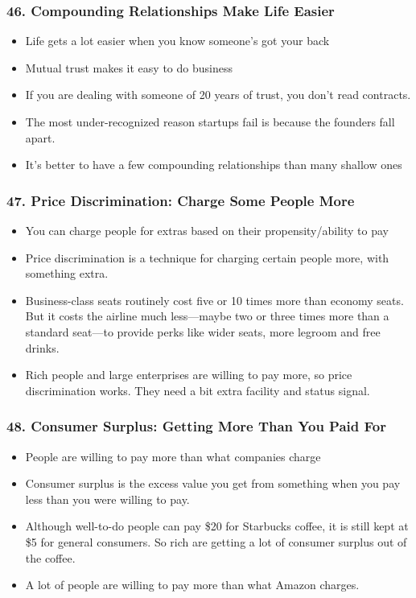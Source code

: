\begin{frame}[fragile]
\frametitle{46. Compounding Relationships Make Life Easier}
\begin{itemize}
\item Life gets a lot easier when you know someone’s got your back
\item Mutual trust makes it easy to do business
\item If you are dealing with someone of 20 years of trust, you don't read contracts.
\item The most under-recognized reason startups fail is because the founders fall apart.
\item It’s better to have a few compounding relationships than many shallow ones
\end{itemize}
\end{frame}

\begin{frame}[fragile]
\frametitle{47. Price Discrimination: Charge Some People More}
\begin{itemize}
\item You can charge people for extras based on their propensity/ability to pay
\item Price discrimination is a technique for charging certain people more, with something extra.
\item Business-class seats routinely cost five or 10 times more than economy seats. But it costs the airline
much less—maybe two or three times more than a standard seat—to provide perks like wider seats, more
legroom and free drinks.
\item Rich people and large enterprises are willing to pay more, so price discrimination works. They need a bit extra facility and status signal.
\end{itemize}
\end{frame}

\begin{frame}[fragile]
\frametitle{48. Consumer Surplus: Getting More Than You Paid For}
\begin{itemize}
\item People are willing to pay more than what companies charge
\item Consumer surplus is the excess
value you get from something when you pay less than you were willing to pay.
\item Although well-to-do people can pay \$20 for Starbucks coffee, it is still kept at \$5 for general consumers. So rich are getting a lot of consumer surplus out of the coffee.
\item A lot of
people are willing to pay more than what Amazon charges.
\end{itemize}
\end{frame}

